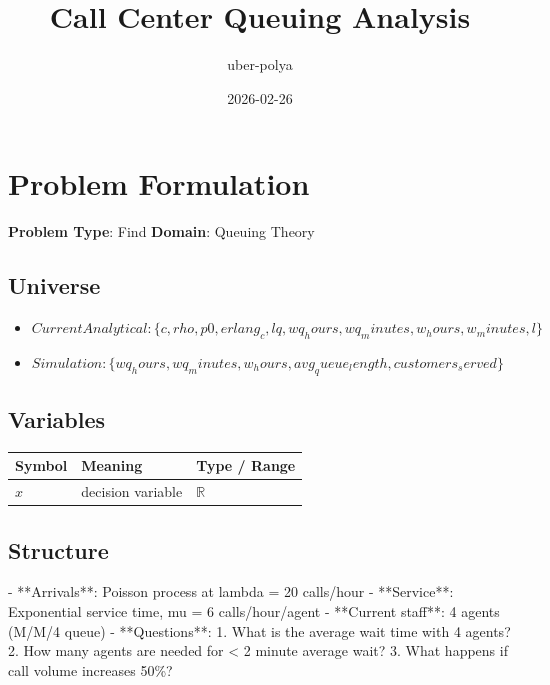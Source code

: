 \documentclass[11pt, a4paper]{article}
\title{Call Center Queuing Analysis}
\author{uber-polya}
\date{2026-02-26}
\begin{document}
\maketitle
\tableofcontents
\newpage

\section{Problem Formulation}

\begin{polyamodel}

\textbf{Problem Type}: Find \hfill
\textbf{Domain}: Queuing Theory


\end{polyamodel}

\subsection{Universe}

\begin{itemize}
  \item $Current Analytical: \{c, rho, p0, erlang_c, lq, wq_hours, wq_minutes, w_hours, w_minutes, l\}$
  \item $Simulation: \{wq_hours, wq_minutes, w_hours, avg_queue_length, customers_served\}$
\end{itemize}

\subsection{Variables}

\begin{longtable}{lll}
\toprule
\textbf{Symbol} & \textbf{Meaning} & \textbf{Type / Range} \\
\midrule
\endhead
$x$ & decision variable & $\mathbb{{R}}$ \\
\bottomrule
\end{longtable}

\subsection{Structure}

- **Arrivals**: Poisson process at lambda = 20 calls/hour
- **Service**: Exponential service time, mu = 6 calls/hour/agent
- **Current staff**: 4 agents (M/M/4 queue)
- **Questions**:
  1. What is the average wait time with 4 agents?
  2. How many agents are needed for < 2 minute average wait?
  3. What happens if call volume increases 50\%?
\end{document}
